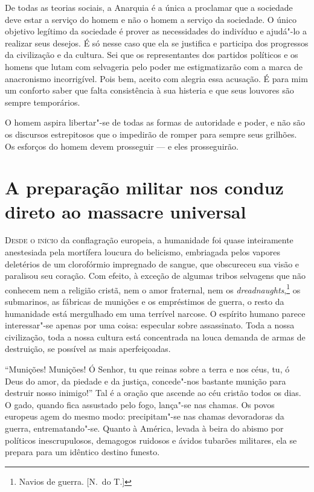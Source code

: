 De todas as teorias sociais, a Anarquia é a única a proclamar que a
sociedade deve estar a serviço do homem e não o homem a serviço da
sociedade. O único objetivo legítimo da sociedade é prover as
necessidades do indivíduo e ajudá"-lo a realizar seus desejos. É só
nesse caso que ela se justifica e participa dos progressos da
civilização e da cultura. Sei que os representantes dos partidos
políticos e os homens que lutam com selvageria pelo poder me
estigmatizarão com a marca de anacronismo incorrigível. Pois bem,
aceito com alegria essa acusação. É para mim um conforto saber que
falta consistência à sua histeria e que seus louvores são sempre
temporários.

O homem aspira libertar"-se de todas as formas de autoridade e poder,
e não são os discursos estrepitosos que o impedirão de romper para
sempre seus grilhões. Os esforços do homem devem prosseguir --- e eles
prosseguirão.

\chapter*{A preparação militar nos conduz direto ao massacre universal}


\textsc{Desde o início} da conflagração europeia, a humanidade foi quase
inteiramente anestesiada pela mortífera loucura do belicismo,
embriagada pelos vapores deletérios de um clorofórmio impregnado de
sangue, que obscureceu sua visão e paralisou seu coração. Com efeito, à
exceção de algumas tribos selvagens que não conhecem nem a religião
cristã, nem o amor fraternal, nem os \textit{dreadnaughts},\footnote{ 
Navios de guerra. [N.~do T.]}
os submarinos, as fábricas de munições e os empréstimos
de guerra, o resto da humanidade está mergulhado em uma terrível
narcose. O espírito humano parece interessar"-se apenas por uma coisa:
especular sobre assassinato. Toda a nossa civilização, toda a nossa
cultura está concentrada na louca demanda de armas de destruição, se
possível as mais aperfeiçoadas.

“Munições! Munições! Ó Senhor, tu que reinas sobre a terra e nos céus,
tu, ó Deus do amor, da piedade e da justiça, concede"-nos bastante
munição para destruir nosso inimigo!” Tal é a oração que ascende ao céu
cristão todos os dias. O gado, quando fica assustado pelo fogo,
lança"-se nas chamas. Os povos europeus agem do mesmo modo:
precipitam"-se nas chamas devoradoras da guerra, entrematando"-se.
Quanto à América, levada à beira do abismo por políticos
inescrupulosos, demagogos ruidosos e ávidos tubarões militares, ela se
prepara para um idêntico destino funesto.

